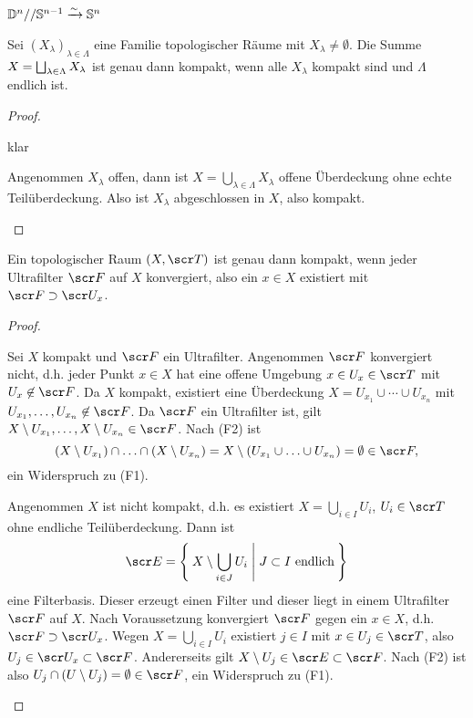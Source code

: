 \begin{ex}
	$\mathbb{D}^n // \mathbb{S}^{n-1} \xrightarrow{\sim} \mathbb{S}^n$
\end{ex}

\begin{st}
	Sei $(X_\lambda)_{\lambda\in\Lambda}$ eine Familie topologischer Räume mit $X_\lambda \neq \emptyset$.
	Die Summe $X = \bigsqcup_{\lambda \in \Lambda} X_\lambda$ ist genau dann kompakt, wenn alle $X_\lambda$ kompakt sind und $\Lambda$ endlich ist.
	\begin{proof}
		\begin{segnb}[„$\impliedby$“]
			klar
		\end{segnb}
		\begin{segnb}[„$\implies$“]
			Angenommen $X_\lambda$ offen, dann ist $X = \bigcup_{\lambda\in\Lambda} X_\lambda$ offene Überdeckung ohne echte Teilüberdeckung.
			Also ist $X_\lambda$ abgeschlossen in $X$, also kompakt.
		\end{segnb}
	\end{proof}
\end{st}

\begin{st}
	Ein topologischer Raum $(X, \scr T)$ ist genau dann kompakt, wenn jeder Ultrafilter $\scr F$ auf $X$ konvergiert, also ein $x \in X$ existiert mit $\scr F \supset \scr U_x$.
	\begin{proof}
		\begin{segnb}[„$\implies$“]
			Sei $X$ kompakt und $\scr F$ ein Ultrafilter.
			Angenommen $\scr F$ konvergiert nicht, d.h. jeder Punkt $x \in X$ hat eine offene Umgebung $x \in U_x \in \scr T$ mit $U_x \not\in \scr F$.
			Da $X$ kompakt, existiert eine Überdeckung $X = U_{x_1} \cup \dotsb \cup U_{x_n}$ mit $U_{x_1}, \dotsc, U_{x_n} \not\in \scr F$.
			Da $\scr F$ ein Ultrafilter ist, gilt $X \setminus U_{x_1}, \dotsc, X \setminus U_{x_n} \in \scr F$.
			Nach (F2) ist
			\[
				(X \setminus U_{x_1}) \cap \dotsc \cap (X \setminus U_{x_n})
				= X \setminus (U_{x_1} \cup \dotsc \cup U_{x_n})
				= \emptyset \in \scr F,
			\]
			ein Widerspruch zu (F1).
		\end{segnb}
		\begin{segnb}[„$\impliedby$“]
			Angenommen $X$ ist nicht kompakt, d.h. es existiert $X = \bigcup_{i\in I} U_i$, $U_i \in \scr T$ ohne endliche Teilüberdeckung.
			Dann ist
			\[
				\scr E
				= \Set{ X \setminus \bigcup_{i\in J} U_i | J \subset I \text{ endlich} }
			\]
			eine Filterbasis.
			Dieser erzeugt einen Filter und dieser liegt in einem Ultrafilter $\scr F$ auf $X$.
			Nach Voraussetzung konvergiert $\scr F$ gegen ein $x \in X$, d.h. $\scr F \supset \scr U_x$.
			Wegen $X = \bigcup_{i\in I} U_i$ existiert $j \in I$ mit $x \in U_j \in \scr T$, also $U_j \in \scr U_x \subset \scr F$.
			Andererseits gilt $X \setminus U_j \in \scr E \subset \scr F$.
			Nach (F2) ist also $U_j \cap (U \setminus U_j) = \emptyset \in \scr F$, ein Widerspruch zu (F1).
		\end{segnb}
	\end{proof}
\end{st}

